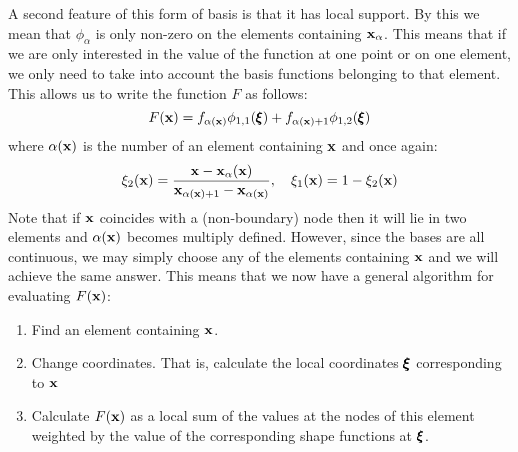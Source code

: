 \documentclass[a4paper, 11pt]{book}
\begin{document}
A second feature of this form of basis is that it has local support. By
this we mean that $\phi_\alpha$ is only non-zero on the elements containing
$\mathbf{x}_\alpha$. This means that if we are only interested in the value of the
function at one point or on one element, we only need to take into account
the basis functions belonging to that element. This allows us to write the
function $F$ as follows:
\begin{equation}
  F(\mathbf{x})= f_{\alpha(\mathbf{x})} \phi_{1,1}(\pmb{\xi}) + f_{\alpha(\mathbf{x})+1}\phi_{1,2}(\pmb{\xi})
\end{equation}
where $\alpha(\mathbf{x})$ is the number of an element containing $\mathbf{x}$ and once
again:
\begin{equation}\label{eq:xi}
  \xi_2(\mathbf{x})=\frac{\mathbf{x}-\mathbf{x}_\alpha(\mathbf{x})}{\mathbf{x}_{\alpha(\mathbf{x})+1}-\mathbf{x}_{\alpha(\mathbf{x})}},
  \quad \xi_1(\mathbf{x})=1-\xi_2(\mathbf{x})
\end{equation}
Note that if $\mathbf{x}$ coincides with a (non-boundary) node then it will lie in
two elements and $\alpha(\mathbf{x})$ becomes multiply defined. However, since the
bases are all continuous, we may simply choose any of the elements
containing $\mathbf{x}$ and we will achieve the same answer. This means that we now
have a general algorithm for evaluating $F(\mathbf{x})$:
\begin{enumerate}
\item Find an element containing $\mathbf{x}$.
\item Change coordinates. That is, calculate the local coordinates $\pmb{\xi}$
  corresponding to $\mathbf{x}$
\item Calculate $F(\mathbf{x})$ as a local sum of the values at the nodes of this
  element weighted by the value of the corresponding shape functions at $\pmb{\xi}$.
\end{enumerate}
\end{document}
